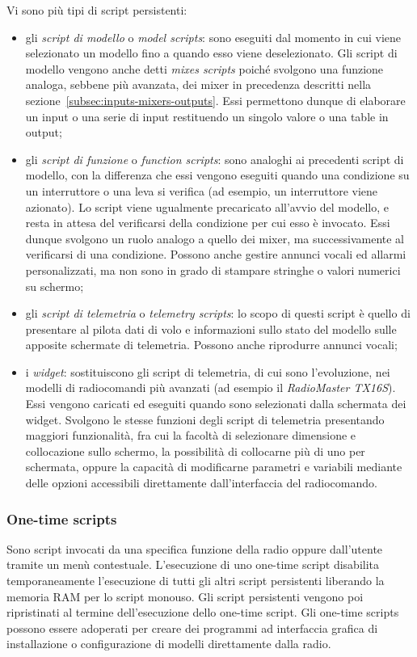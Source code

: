 \documentclass[a4paper, 12pt]{report}
\begin{document}
Vi sono più tipi di script persistenti:
\begin{itemize}
        \item gli \emph{script di modello} o \emph{model scripts}: sono eseguiti dal momento in cui viene selezionato un modello fino a quando esso viene deselezionato. Gli script di modello vengono anche detti \emph{mixes scripts} poiché svolgono una funzione analoga, sebbene più avanzata, dei mixer in precedenza descritti nella sezione~\ref{subsec:inputs-mixers-outputs}. Essi permettono dunque di elaborare un input o una serie di input restituendo un singolo valore o una table in output;

        \item gli \emph{script di funzione} o \emph{function scripts}: sono analoghi ai precedenti script di modello, con la differenza che essi vengono eseguiti quando una condizione su un interruttore o una leva si verifica (ad esempio, un interruttore viene azionato). Lo script viene ugualmente precaricato all'avvio del modello, e resta in attesa del verificarsi della condizione per cui esso è invocato. Essi dunque svolgono un ruolo analogo a quello dei mixer, ma successivamente al verificarsi di una condizione. Possono anche gestire annunci vocali ed allarmi personalizzati, ma non sono in grado di stampare stringhe o valori numerici su schermo;

        \item gli \emph{script di telemetria} o \emph{telemetry scripts}: lo scopo di questi script è quello di presentare al pilota dati di volo e informazioni sullo stato del modello sulle apposite schermate di telemetria. Possono anche riprodurre annunci vocali;

        \item i \emph{widget}: sostituiscono gli script di telemetria, di cui sono l'evoluzione, nei modelli di radiocomandi più avanzati (ad esempio il \emph{RadioMaster TX16S}). Essi vengono caricati ed eseguiti quando sono selezionati dalla schermata dei widget. Svolgono le stesse funzioni degli script di telemetria presentando maggiori funzionalità, fra cui la facoltà di selezionare dimensione e collocazione sullo schermo, la possibilità di collocarne più di uno per schermata, oppure la capacità di modificarne parametri e variabili mediante delle opzioni accessibili direttamente dall'interfaccia del radiocomando.
\end{itemize}

\subsubsection{One-time scripts}
        Sono script invocati da una specifica funzione della radio oppure dall'utente tramite un menù contestuale. L'esecuzione di uno one-time script disabilita temporaneamente l'esecuzione di tutti gli altri script persistenti liberando la memoria RAM per lo script monouso. Gli script persistenti vengono poi ripristinati al termine dell'esecuzione dello one-time script. Gli one-time scripts possono essere adoperati per creare dei programmi ad interfaccia grafica di installazione o configurazione di modelli direttamente dalla radio.
\end{document}
